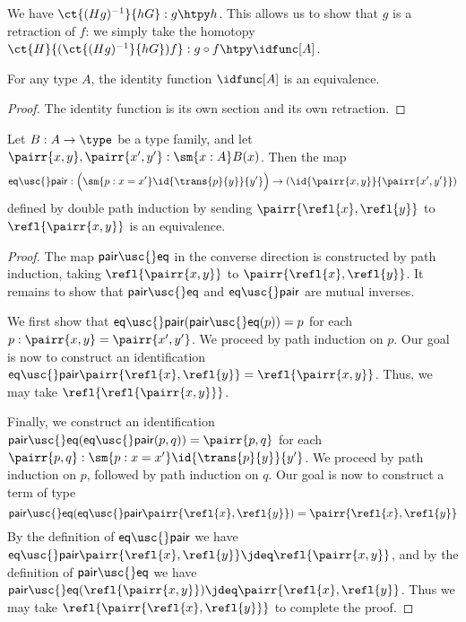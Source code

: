 \begin{constr}
We have $\ct{(Hg)^{-1}}{hG}:g\htpy h$. This allows us to show that $g$ is a retraction of $f$: we simply take the homotopy $\ct{H}{(\ct{(Hg)^{-1}}{hG})f}:g\circ f \htpy \idfunc[A]$. 
\end{constr}

\begin{thm}\label{thm:id_equiv}
For any type $A$, the identity function $\idfunc[A]$ is an equivalence.
\end{thm}

\begin{proof}
The identity function is its own section and its own retraction.
\end{proof}

\begin{thm}\label{thm:eq_sigma}
Let $B:A\to\type$ be a type family, and let $\pairr{x,y},\pairr{x',y'}:\sm{x:A}B(x)$. Then the map
\begin{equation*}
\mathsf{eq\usc{}pair} : \Big(\sm{p:x=x'}\id{\trans{p}{y}}{y'}\Big)\to(\id{\pairr{x,y}}{\pairr{x',y'}})
\end{equation*}
defined by double path induction by sending $\pairr{\refl{x},\refl{y}}$ to $\refl{\pairr{x,y}}$ is an equivalence.
\end{thm}

\begin{proof}
The map $\mathsf{pair\usc{}eq}$ in the converse direction is constructed by path induction, taking $\refl{\pairr{x,y}}$ to $\pairr{\refl{x},\refl{y}}$.
It remains to show that $\mathsf{pair\usc{}eq}$ and $\mathsf{eq\usc{}pair}$ are mutual inverses. 

We first show that $\mathsf{eq\usc{}pair}(\mathsf{pair\usc{}eq}(p))=p$ for each $p:\pairr{x,y}=\pairr{x',y'}$. We proceed by path induction on $p$. 
Our goal is now to construct an identification $\mathsf{eq\usc{}pair}\pairr{\refl{x},\refl{y}}=\refl{\pairr{x,y}}$. 
Thus, we may take $\refl{\refl{\pairr{x,y}}}$.

Finally, we construct an identification $\mathsf{pair\usc{}eq}(\mathsf{eq\usc{}pair}(p,q))=\pairr{p,q}$ for each $\pairr{p,q}:\sm{p:x=x'}\id{\trans{p}{y}}{y'}$. We proceed by path induction on $p$, followed by path induction on $q$. Our goal is now to construct a term of type
\begin{equation*}
\mathsf{pair\usc{}eq}(\mathsf{eq\usc{}pair}\pairr{\refl{x},\refl{y}})=\pairr{\refl{x},\refl{y}}
\end{equation*}
By the definition of $\mathsf{eq\usc{}pair}$ we have $\mathsf{eq\usc{}pair}\pairr{\refl{x},\refl{y}}\jdeq \refl{\pairr{x,y}}$, and by the definition of $\mathsf{pair\usc{}eq}$ we have $\mathsf{pair\usc{}eq}(\refl{\pairr{x,y}})\jdeq\pairr{\refl{x},\refl{y}}$. Thus we may take $\refl{\pairr{\refl{x},\refl{y}}}$ to complete the proof.
\end{proof}


